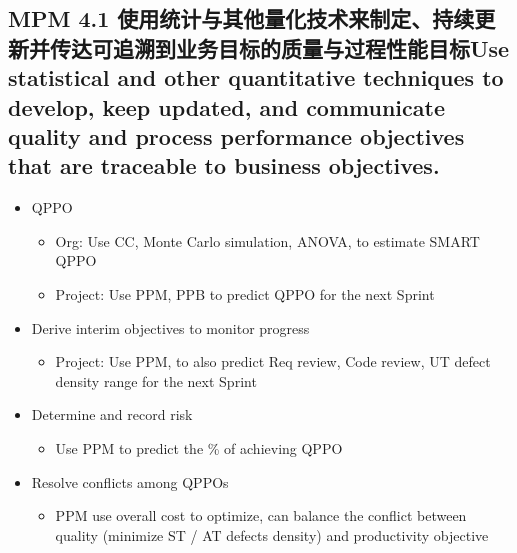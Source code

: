 \hypertarget{mpm-4.1-ux4f7fux7528ux7edfux8ba1ux4e0eux5176ux4ed6ux91cfux5316ux6280ux672fux6765ux5236ux5b9aux6301ux7eedux66f4ux65b0ux5e76ux4f20ux8fbeux53efux8ffdux6eafux5230ux4e1aux52a1ux76eeux6807ux7684ux8d28ux91cfux4e0eux8fc7ux7a0bux6027ux80fdux76eeux6807use-statistical-and-other-quantitative-techniques-to-develop-keep-updated-and-communicate-quality-and-process-performance-objectives-that-are-traceable-to-business-objectives.}{%
\subsection{MPM 4.1
使用统计与其他量化技术来制定、持续更新并传达可追溯到业务目标的质量与过程性能目标Use
statistical and other quantitative techniques to develop, keep updated,
and communicate quality and process performance objectives that are
traceable to business
objectives.}\label{mpm-4.1-ux4f7fux7528ux7edfux8ba1ux4e0eux5176ux4ed6ux91cfux5316ux6280ux672fux6765ux5236ux5b9aux6301ux7eedux66f4ux65b0ux5e76ux4f20ux8fbeux53efux8ffdux6eafux5230ux4e1aux52a1ux76eeux6807ux7684ux8d28ux91cfux4e0eux8fc7ux7a0bux6027ux80fdux76eeux6807use-statistical-and-other-quantitative-techniques-to-develop-keep-updated-and-communicate-quality-and-process-performance-objectives-that-are-traceable-to-business-objectives.}}

\begin{itemize}
\tightlist
\item
  QPPO

  \begin{itemize}
  \tightlist
  \item
    Org: Use CC, Monte Carlo simulation, ANOVA, to estimate SMART QPPO
  \item
    Project: Use PPM, PPB to predict QPPO for the next Sprint
  \end{itemize}
\item
  Derive interim objectives to monitor progress

  \begin{itemize}
  \tightlist
  \item
    Project: Use PPM, to also predict Req review, Code review, UT defect
    density range for the next Sprint
  \end{itemize}
\item
  Determine and record risk

  \begin{itemize}
  \tightlist
  \item
    Use PPM to predict the \% of achieving QPPO
  \end{itemize}
\item
  Resolve conflicts among QPPOs

  \begin{itemize}
  \tightlist
  \item
    PPM use overall cost to optimize, can balance the conflict between
    quality (minimize ST / AT defects density) and productivity
    objective
  \end{itemize}
\end{itemize}

